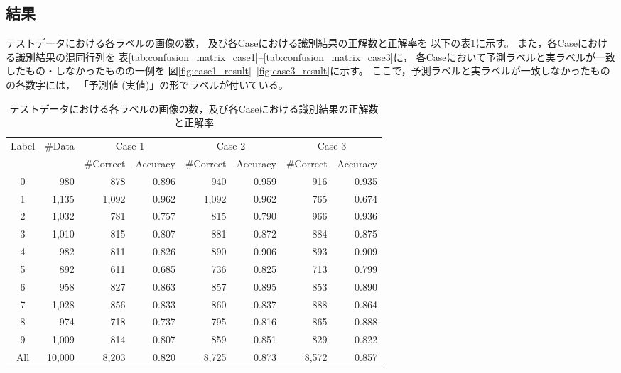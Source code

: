 \documentclass[class=jsarticle, crop=false, dvipdfmx, fleqn]{standalone}
\begin{document}
\newpage
\subsection*{結果}

テストデータにおける各ラベルの画像の数，
及び各Caseにおける識別結果の正解数と正解率を
以下の表\ref{tab:result}に示す。
また，各Caseにおける識別結果の混同行列を
表\ref{tab:confusion_matrix_case1}--\ref{tab:confusion_matrix_case3}に，
各Caseにおいて予測ラベルと実ラベルが一致したもの・しなかったものの一例を
図\ref{fig:case1_result}--\ref{fig:case3_result}に示す。
ここで，予測ラベルと実ラベルが一致しなかったものの各数字には，
「予測値 (実値)」の形でラベルが付いている。


\begin{table}
    \centering
    \caption{テストデータにおける各ラベルの画像の数，及び各Caseにおける識別結果の正解数と正解率}
    \begin{tabular}{|c|r|rr|rr|rr|} \hline
        Label & \#Data & \multicolumn{2}{c|}{Case 1} & \multicolumn{2}{c|}{Case 2} & \multicolumn{2}{c|}{Case 3} \\
         & & \#Correct & Accuracy & \#Correct & Accuracy & \#Correct & Accuracy \\ \hline
        0 &      980 &   878 & 0.896 &   940 & 0.959 &   916 & 0.935 \\
        1 &    1,135 & 1,092 & 0.962 & 1,092 & 0.962 &   765 & 0.674 \\
        2 &    1,032 &   781 & 0.757 &   815 & 0.790 &   966 & 0.936 \\
        3 &    1,010 &   815 & 0.807 &   881 & 0.872 &   884 & 0.875 \\
        4 &      982 &   811 & 0.826 &   890 & 0.906 &   893 & 0.909 \\
        5 &      892 &   611 & 0.685 &   736 & 0.825 &   713 & 0.799 \\
        6 &      958 &   827 & 0.863 &   857 & 0.895 &   853 & 0.890 \\
        7 &    1,028 &   856 & 0.833 &   860 & 0.837 &   888 & 0.864 \\
        8 &      974 &   718 & 0.737 &   795 & 0.816 &   865 & 0.888 \\
        9 &    1,009 &   814 & 0.807 &   859 & 0.851 &   829 & 0.822 \\
        All & 10,000 & 8,203 & 0.820 & 8,725 & 0.873 & 8,572 & 0.857 \\
        \hline
    \end{tabular}
    \label{tab:result}
\end{table}
\end{document}
